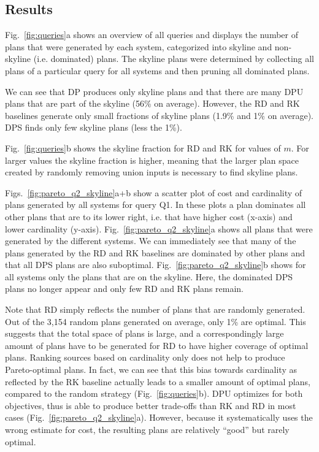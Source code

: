 \subsection{Results}
Fig.~\ref{fig:queries}a shows an overview of all queries and displays
the number of plans that were generated by each system, categorized
into skyline and non-skyline (i.e.  dominated) plans. The skyline
plans were determined by collecting all plans of a particular query
for all systems and then pruning all dominated plans.

We can see that DP produces only skyline plans and that there are many
DPU plans that are part of the skyline (56\% on average). However, the
RD and RK baselines generate only small fractions of skyline plans
(1.9\% and 1\% on average). DPS finds only few skyline plans (less the
1\%).

Fig.~\ref{fig:queries}b shows the skyline fraction for RD and RK for
values of $m$. For larger values the skyline fraction is
higher, meaning that the larger plan space created by randomly
removing union inputs is necessary to find skyline plans.

Figs.~\ref{fig:pareto_q2_skyline}a+b show a scatter plot of cost and
cardinality of plans generated by all systems for query Q1. In these
plots a plan dominates all other plans that are to its lower right,
i.e. that have higher cost (x-axis) and lower cardinality
(y-axis). Fig.~\ref{fig:pareto_q2_skyline}a shows all plans that were
generated by the different systems. We can immediately see that many
of the plans generated by the RD and RK baselines are dominated by
other plans and that all DPS plans are also
suboptimal. Fig.~\ref{fig:pareto_q2_skyline}b shows for all systems
only the plans that are on the skyline. Here, the dominated DPS plans
no longer appear and only few RD and RK plans remain.


Note that RD simply reflects the number of plans that are randomly
generated. Out of the 3,154 random plans generated on average, only
1\% are optimal. This suggests that the total space of plans is large,
and a correspondingly large amount of plans have to be generated for
RD to have higher coverage of optimal plans. Ranking sources based on
cardinality only does not help to produce Pareto-optimal plans. In
fact, we can see that this bias towards cardinality as reflected by
the RK baseline actually leads to a smaller amount of optimal plans,
compared to the random strategy (Fig.~\ref{fig:queries}b). DPU
optimizes for both objectives, thus is able to produce better
trade-offs than RK and RD in most cases
(Fig.~\ref{fig:pareto_q2_skyline}a). However, because it
systematically uses the wrong estimate for cost, the resulting plans
are relatively ``good'' but rarely optimal.


